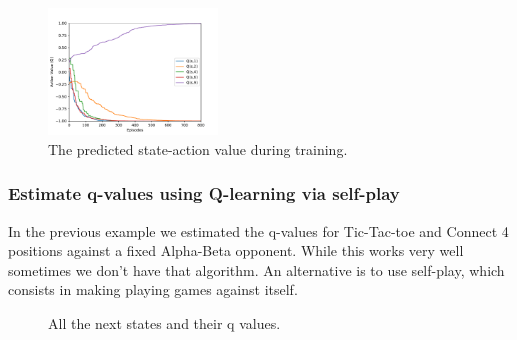 \documentclass{article}
\begin{document}

\begin{figure}[!h]
    \centering
    \includegraphics[width=0.40\textwidth]{figures/tic_ql_tab_action_values.pdf}
    \caption{The predicted state-action value during training.}
    \label{fig:tic-ql-tab-qvalues-progress}
\end{figure}

\subsubsection{Estimate q-values using Q-learning via self-play}

In the previous example we estimated the q-values for Tic-Tac-toe and Connect 4 positions against a
fixed Alpha-Beta opponent. While this works very well sometimes we don't have that algorithm. An
alternative is to use self-play, which consists in making playing games against itself.



\begin{figure}[!h]
    \centering
     \hspace{0.1in}
    \caption{All the next states and their q values.}
    \label{fig:ql-tab-simple-selfplay-progress}
\end{figure}
\end{document}
